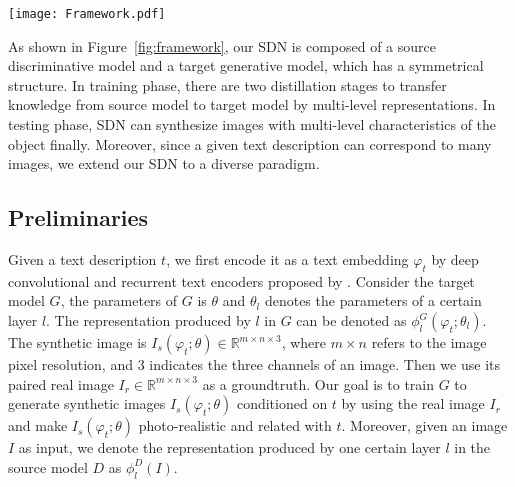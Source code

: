 \documentclass[sigconf]{acmart}
\begin{document}
\begin{figure*}
	\begin{center}
		\texttt{[image: Framework.pdf]}
	\end{center}
	\caption{The architecture of proposed Symmetrical Distillation Networks (SDN), which consists of a source discriminative model and a target generative model. The source model receives images as input and produces multi-level representations as guidance for the training of target model. The target model generates images conditioned on the text embedding produced by text encoders. The SDN applies two kinds of distillation loss in different stage to transfer hierarchical knowledge from the source model to the target model.}
	\label{fig:framework}
\end{figure*}

As shown in Figure~\ref{fig:framework}, our SDN is composed of a source discriminative model and a target generative model, which has a symmetrical structure. In training phase, there are two distillation stages to transfer knowledge from source model to target model by multi-level representations. In testing phase, SDN can synthesize images with multi-level characteristics of the object finally. Moreover, since a given text description can correspond to many images, we extend our SDN to a diverse paradigm. 

\subsection{Preliminaries}
Given a text description $t$, we first encode it as a text embedding $\varphi_t$ by deep convolutional and recurrent text encoders proposed by \cite{reed2016learning}. Consider the target model $G$, the parameters of $G$ is $\theta$ and $\theta_l$ denotes the parameters of a certain layer $l$. The representation produced by $l$ in $G$ can be denoted as $\phi_l^G(\varphi_t;\theta_l)$. The synthetic image is $I_s(\varphi_t;\theta) \in \mathbb{R}^{m \times n \times 3}$, where $m \times n$ refers to the image pixel resolution, and $3$ indicates the three channels of an image. Then we use its paired real image $I_r \in \mathbb{R}^{m \times n \times 3}$ as a groundtruth. Our goal is to train $G$ to generate synthetic images $I_s(\varphi_t;\theta)$ conditioned on $t$ by using the real image $I_r$ and make $I_s(\varphi_t;\theta)$ photo-realistic and related with $t$. Moreover, given an image $I$ as input, we denote the representation produced by one certain layer $l$ in the source model $D$ as $\phi_l^D(I)$.
\end{document}
